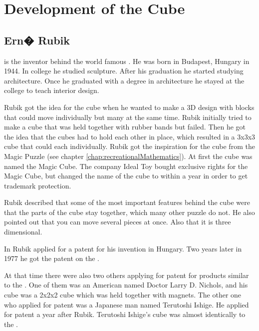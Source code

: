 \chapter{Development of the Cube}
\section{Ern� Rubik}
\erno{} is the inventor behind the world famous \rubik{}. He was born in Budapest, Hungary in 1944.  In college he studied sculpture. After his graduation he started studying architecture.  Once he graduated with a degree in architecture he stayed at the college to teach interior design.

Rubik got the idea for the cube when he wanted to make a 3D design with blocks that could move individually but many at the same time. Rubik initially tried  to make a cube that was held together with rubber bands but failed. Then he got the idea that the cubes had to hold each other in place, which resulted in a 3x3x3 cube that could \twist{} each \face{} individually. Rubik got the inspiration for the cube from the Magic Puzzle (see chapter \ref{chap:recreationalMathematics}). At first the cube was named the Magic Cube. The company Ideal Toy bought exclusive rights for the Magic Cube, but changed the name of the cube to \rubik{} within a year in order to get trademark protection.

Rubik described that some of the most important features behind the cube were that the parts of the cube stay together, which many other puzzle do not. He also pointed out that you can move several pieces at once. Also that it is three dimensional. 

In  Rubik applied for a patent for his invention in Hungary. Two years later in 1977 he got the patent on the \rubik{}.

At that time there were also two others applying for patent for products similar to the \rubik{}.  One of them was an American named Doctor Larry D. Nichols, and his cube was a 2x2x2 cube which was held together with magnets. The other one who applied for patent was a Japanese man named Terutoshi Ishige. He applied for patent a year after Rubik. Terutoshi Ishige's cube was almost identically to the \rubik{}. 

